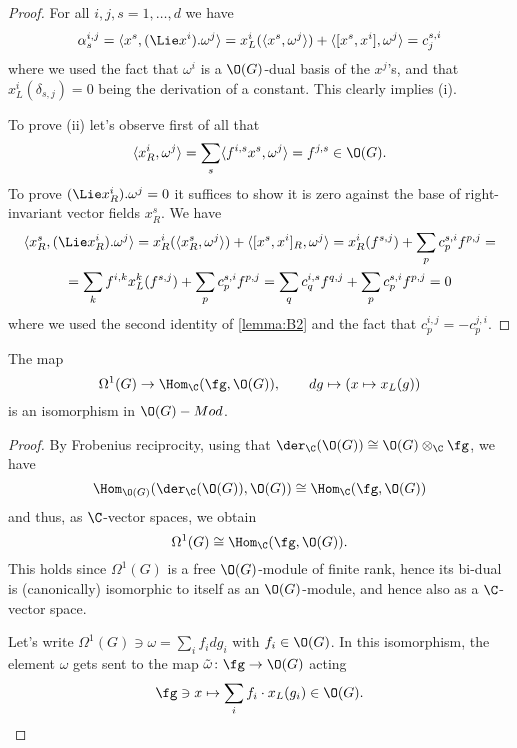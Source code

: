 \documentclass[a4paper, 10pt]{article}
\begin{document}
            \begin{proof}
                For all $i, j, s = 1, \dots, d$ we have \[\alpha^{i,j}_s = \langle x^s, (\Lie x^i).\omega^j \rangle = x^i_L(\langle x^s, \omega^j\rangle) + \langle [x^s, x^i], \omega^j \rangle = c^{s, i}_j \] where we used the fact that $\omega^i$ is a $\O(G)$-dual basis of the $x^j$'s, and that $x^i_L(\delta_{s, j}) = 0$ being the derivation of a constant.
                This clearly implies (i).

                To prove (ii) let's observe first of all that \[\langle x^i_R, \omega^j \rangle = \sum_s \langle f^{i, s}x^s, \omega^j \rangle = f^{j, s} \in \O(G). \] To prove $(\Lie x^i_R).\omega^j = 0$ it suffices to show it is zero against the base of right-invariant vector fields $x^s_R$. We have 
                \begin{gather*}
                    \langle x^s_R, (\Lie x^i_R).\omega^j \rangle = x^i_R(\langle x^s_R, \omega^j\rangle) + \langle [x^s, x^i]_R, \omega^j \rangle = x^i_R(f^{s, j}) + \sum_p c^{s, i}_pf^{p, j} = \\
                    = \sum_k f^{i, k}x^k_L(f^{s, j}) + \sum_p c^{s, i}_pf^{p, j} = \sum_q c^{i, s}_qf^{q, j} + \sum_p c^{s, i}_pf^{p, j} = 0
                \end{gather*}
                where we used the second identity of \cref{lemma:B2} and the fact that $c^{i, j}_p = -c^{j, i}_p$.
            \end{proof}
            \begin{prop}
                The map \[\Omega^1(G) \to \Hom_{\C}(\fg, \O(G)), \qquad dg \mapsto (x \mapsto x_L(g)) \] is an isomorphism in $\O(G)-Mod$.
            \end{prop}
            \begin{proof}
                By Frobenius reciprocity, using that $\der_{\C}(\O(G)) \cong \O(G) \otimes_{\C} \fg$, we have \[\Hom_{\O(G)}(\der_{\C}(\O(G)), \O(G)) \cong \Hom_{\C}(\fg, \O(G)) \] and thus, as $\C$-vector spaces, we obtain \[\Omega^1(G) \cong \Hom_{\C}(\fg, \O(G)). \] This holds since $\Omega^1(G)$ is a free $\O(G)$-module of finite rank, hence its bi-dual is (canonically) isomorphic to itself as an $\O(G)$-module, and hence also as a $\C$-vector space.

                Let's write $\Omega^1(G) \ni \omega = \sum_i f_idg_i$ with $f_i \in \O(G)$. In this isomorphism, the element $\omega$ gets sent to the map $\tilde{\omega}\colon \fg \to \O(G)$ acting \[\fg \ni x \mapsto \sum_i f_i\cdot x_L(g_i) \in \O(G). \]
            \end{proof}
\end{document}
